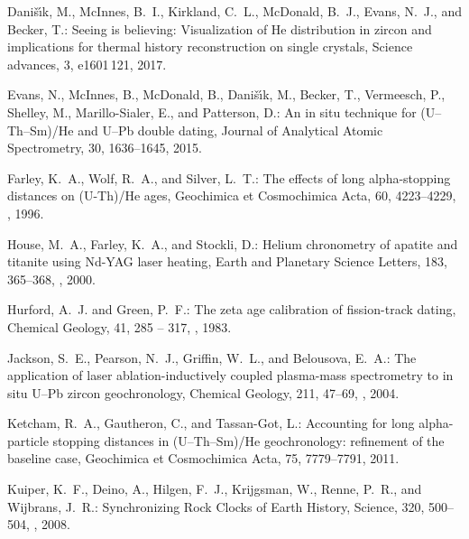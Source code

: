 \documentclass{article}
\begin{document}
\begin{thebibliography}{24}
Dani{\v{s}}{\'\i}k, M., McInnes, B.~I., Kirkland, C.~L., McDonald, B.~J.,
  Evans, N.~J., and Becker, T.: {Seeing is believing: Visualization of He
  distribution in zircon and implications for thermal history reconstruction on
  single crystals}, Science advances, 3, e1601\,121, 2017.

Evans, N., McInnes, B., McDonald, B., Dani{\v{s}}{\'\i}k, M., Becker, T.,
  Vermeesch, P., Shelley, M., Marillo-Sialer, E., and Patterson, D.: {An in
  situ technique for (U--Th--Sm)/He and U--Pb double dating}, Journal of
  Analytical Atomic Spectrometry, 30, 1636--1645, 2015.

{Farley}, K.~A., {Wolf}, R.~A., and {Silver}, L.~T.: {The effects of long
  alpha-stopping distances on (U-Th)/He ages}, Geochimica et Cosmochimica Acta,
  60, 4223--4229, , 1996.

{House}, M.~A., {Farley}, K.~A., and {Stockli}, D.: {Helium chronometry of
  apatite and titanite using Nd-YAG laser heating}, Earth and Planetary Science
  Letters, 183, 365--368, , 2000.

Hurford, A.~J. and Green, P.~F.: The zeta age calibration of fission-track
  dating, Chemical Geology, 41, 285 -- 317,
  , 1983.

Jackson, S.~E., Pearson, N.~J., Griffin, W.~L., and Belousova, E.~A.: {The
  application of laser ablation-inductively coupled plasma-mass spectrometry to
  in situ U--Pb zircon geochronology}, Chemical Geology, 211, 47--69,
  , 2004.

Ketcham, R.~A., Gautheron, C., and Tassan-Got, L.: {Accounting for long
  alpha-particle stopping distances in (U--Th--Sm)/He geochronology: refinement
  of the baseline case}, Geochimica et Cosmochimica Acta, 75, 7779--7791, 2011.

{Kuiper}, K.~F., {Deino}, A., {Hilgen}, F.~J., {Krijgsman}, W., {Renne}, P.~R.,
  and {Wijbrans}, J.~R.: {Synchronizing Rock Clocks of Earth History}, Science,
  320, 500--504, , 2008.


\end{thebibliography}
\end{document}
